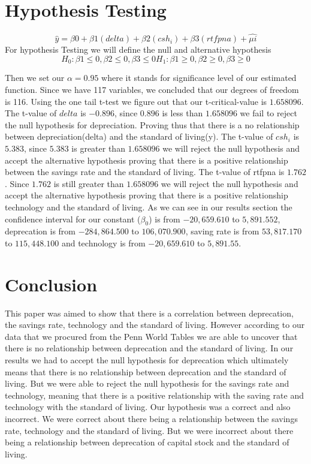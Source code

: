 \documentclass{article}
\begin{document}
\section{Hypothesis Testing}
\begin{equation}
    \widehat {y} = \beta 0+\beta 1 (delta) + \beta 2 (csh_i) + \beta 3  (rtfpna) + \widehat {\mu i}
\end{equation}
For hypothesis Testing we will define the null and alternative hypothesis
\begin{equation}
    H_0 : \beta 1 \le 0,\beta 2 \le 0,\beta 3 \le 0 H_1:\beta 1 \ge 0,\beta 2 \ge 0,\beta 3 \ge 0
\end{equation}


Then we set our $ \alpha = 0.95 $ where it stands for significance level of our estimated function. Since we have 117 variables, we concluded that our degrees of freedom is 116. Using the one tail t-test we figure out that our t-critical-value is $1.658096$. The t-value of $delta$ is $-0.896$, since $0.896$ is less than $1.658096$ we fail to reject the null hypothesis for depreciation. Proving thus that there is a no relationship between depreciation(delta) and the standard of living(y). The t-value of $csh_i$ is $5.383$, since $5.383$ is greater than $1.658096$ we will reject the null hypothesis and accept the alternative hypothesis proving that there is a positive relationship between the savings rate and the standard of living. The t-value of rtfpna is $1.762$. Since $1.762$ is still greater than $1.658096$ we will reject the null hypothesis and accept the alternative hypothesis proving that there is a positive relationship technology and the standard of living. As we can see in our results section the confidence interval for our constant ($ \beta_0 $) is from $−20,659.610$ to  $5,891.552$, deprecation is from $−284,864.500$ to $106,070.900$, saving rate is from $53,817.170$ to $115,448.100$ and technology is from $−20,659.610$ to $5,891.55$. 



\section{Conclusion}
This paper was aimed to show that there is a correlation between deprecation, the savings rate, technology and the standard of living. However according to our data that we procured from the Penn World Tables we are able to uncover that there is no relationship between deprecation and the standard of living. In our results we had to accept the null hypothesis for deprecation which ultimately means that there is no relationship between deprecation and the standard of living. But we were able to reject the null hypothesis for the savings rate and technology, meaning that there is a positive relationship with the saving rate and technology with the standard of living. Our hypothesis was a correct and also incorrect. We were correct about there being a relationship between the savings rate, technology and the standard of living. But we were incorrect about there being a relationship between deprecation of capital stock and the standard of living.
\end{document}
